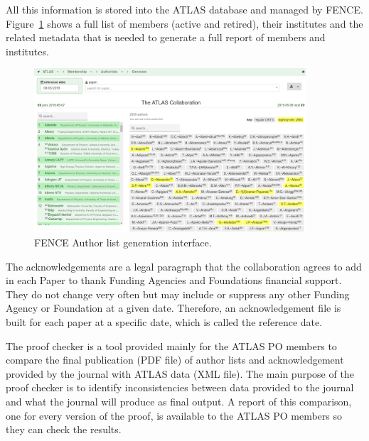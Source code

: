 All this information is stored into the ATLAS database and managed by FENCE. Figure~\ref{fig:authorlist_generation} shows a full list of members (active and retired), their institutes and the related metadata that is needed to generate a full report of members and institutes.
\begin{figure}[ht!]
  \centering
  \includegraphics[width=0.9\textwidth]{figures/authorlist_generation.png}
  \caption{FENCE Author list generation interface.}
  \label{fig:authorlist_generation}
\end{figure}

The acknowledgements are a legal paragraph that the collaboration agrees to add in each Paper to thank Funding Agencies and Foundations financial support. They do not change very often but may include or suppress any other Funding Agency or Foundation at a given date. Therefore, an acknowledgement file is built for each paper at a specific date, which is called the reference date.
 
The proof checker is a tool provided mainly for the ATLAS PO members to compare the final publication (PDF file) of author lists and acknowledgement provided by the journal with ATLAS data (XML file). The main purpose of the proof checker is to identify inconsistencies between data provided to the journal and what the journal will produce as final output. A report of this comparison, one for every version of the proof, is available to the ATLAS PO members so they can check the results.
